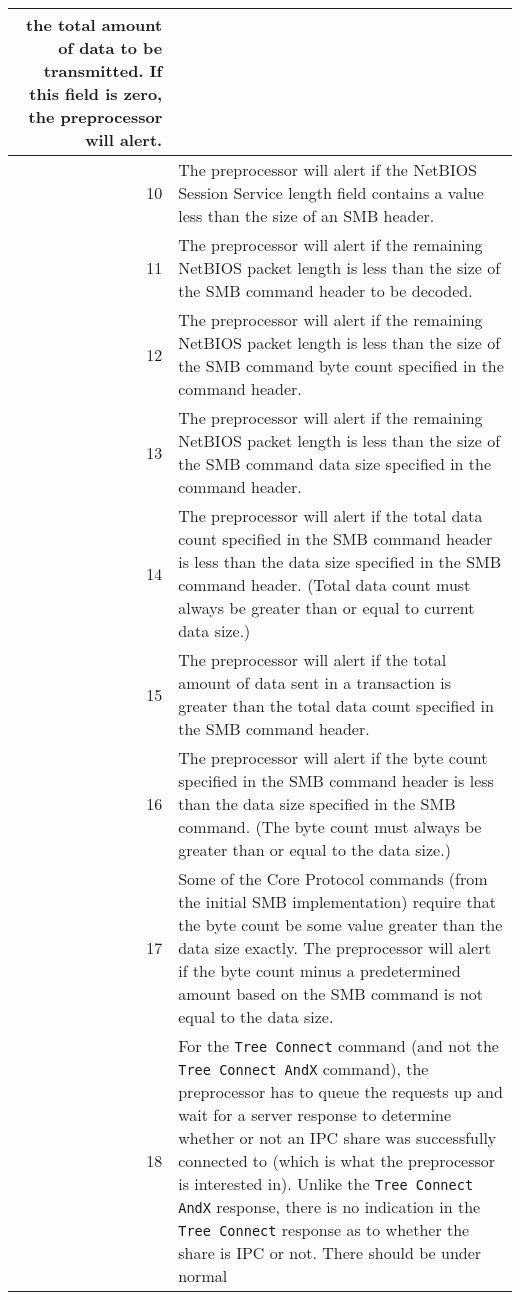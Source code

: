 \documentclass[english]{report}
\begin{document}
\begin{itemize}
\begin{longtable}{|r|p{13.5cm}|}
      the total amount of data to be transmitted. If this field is zero, the
      preprocessor will alert.\\
\hline
 10 & The preprocessor will alert if the NetBIOS Session Service length field
      contains a value less than the size of an SMB header.\\
\hline
 11 & The preprocessor will alert if the remaining NetBIOS packet length is
      less than the size of the SMB command header to be decoded.\\
\hline
 12 & The preprocessor will alert if the remaining NetBIOS packet length is
      less than the size of the SMB command byte count specified in the
      command header.\\
\hline
 13 & The preprocessor will alert if the remaining NetBIOS packet length is
      less than the size of the SMB command data size specified in the command
      header.\\
\hline
 14 & The preprocessor will alert if the total data count specified in the
      SMB command header is less than the data size specified in the SMB
      command header. (Total data count must always be greater than or equal
      to current data size.)\\
\hline
 15 & The preprocessor will alert if the total amount of data sent in a
      transaction is greater than the total data count specified in the SMB
      command header.\\
\hline
 16 & The preprocessor will alert if the byte count specified in the SMB
      command header is less than the data size specified in the SMB command.
      (The byte count must always be greater than or equal to the data size.)\\
\hline
 17 & Some of the Core Protocol commands (from the initial SMB implementation)
      require that the byte count be some value greater than the data size
      exactly. The preprocessor will alert if the byte count minus a
      predetermined amount based on the SMB command is not equal to the data
      size.\\
\hline
 18 & For the \texttt{Tree Connect} command (and not the
      \texttt{Tree Connect AndX} command), the preprocessor has to queue
      the requests up and wait for a server response to determine whether or
      not an IPC share was successfully connected to (which is what the
      preprocessor is interested in). Unlike the \texttt{Tree Connect AndX}
      response, there is no indication in the \texttt{Tree Connect} response
      as to whether the share is IPC or not. There should be under normal

\end{longtable}
\end{itemize}
\end{document}
